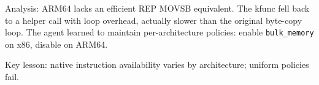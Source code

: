 \documentclass[sigplan,10pt,anonymous,nonacm]{acmart}
\begin{document}
Analysis: ARM64 lacks an efficient REP MOVSB equivalent. The kfunc fell back to a helper call with loop overhead, actually slower than the original byte-copy loop. The agent learned to maintain per-architecture policies: enable \texttt{bulk\_memory} on x86, disable on ARM64.

Key lesson: native instruction availability varies by architecture; uniform policies fail.
\end{document}
